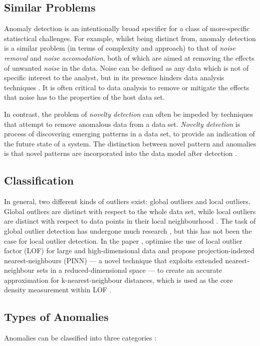 \subsection{Similar Problems}
\label{anomalyDetection:similarProblems}
Anomaly detection is an intentionally broad specifier for a class of
more-specific statisctical challenges. For example, whilst being distinct from,
anomaly detection is a similar problem (in terms of complexity and approach) to
that of \emph{noise removal} and \emph{noise accomodation}, both of which are
aimed at removing the effects of unwanted \emph{noise} in the data. Noise can be
defined as any data which is not of specific interest to the analyst, but in its
presence hinders data analysis techniques \cite{Chandola:2007}. It is often
critical to data analysis to remove or mitigate the effects that noise has to
the properties of the host data set.

In contrast, the problem of \emph{novelty detection} can often be impeded by
techniques that attempt to remove anomalous data from a data set. \emph{Novelty
detection} is process of discovering emerging patterns in a data set, to provide
an indication of the future state of a system. The distinction between novel
pattern and anomalies is that novel patterns are incorporated into the data
model after detection \cite{Chandola:2007}.

\subsection{Classification}
\label{anomalyDetection:anomalyClassification}
In general, two different kinds of outliers exist: global outliers and local
outliers. Global outliers are distinct with respect to the whole data set, while
local outliers are distinct with respect to data points in their local
neighbourhood \cite{Vries:2011}. The task of global outlier detection has
undergone much research \citeNeeded{}, but this has not been the case for local
outlier detection. In the paper , \citeauthor{Vries:2011}
optimise the use of local outlier factor (LOF) for large and high-dimensional
data and propose projection-indexed nearest-neighbours (PINN) --- a novel
technique that exploits extended nearest-neighbour sets in a reduced-dimensional
space --- to create an accurate approximation for k-nearest-neighbour distances,
which is used as the core density measurement within LOF \cite{Vries:2011}.

\subsection{Types of Anomalies}
\label{anomalyDetection:typesOfAnomalies}
Anomalies can be classified into three categories \cite{Chandola:2007}:

